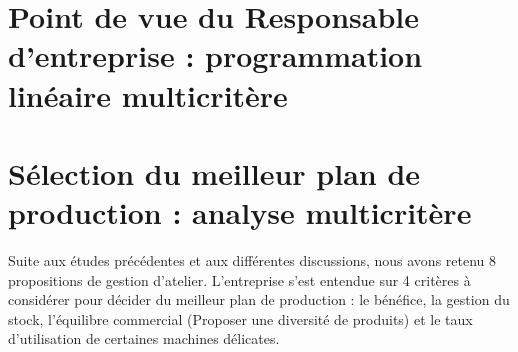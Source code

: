 \documentclass[12pt]{article}
\begin{document}
\section{Point de vue du Responsable d'entreprise : programmation linéaire multicritère}


\section{Sélection du meilleur plan de production : analyse multicritère}
Suite aux études précédentes et aux différentes discussions, nous avons retenu 8 propositions de gestion d'atelier.
L'entreprise s'est entendue sur 4 critères à considérer pour décider du meilleur plan de production : le bénéfice, la gestion du stock, l'équilibre commercial (Proposer une diversité de produits) et le taux d'utilisation de certaines machines délicates.
\end{document}
